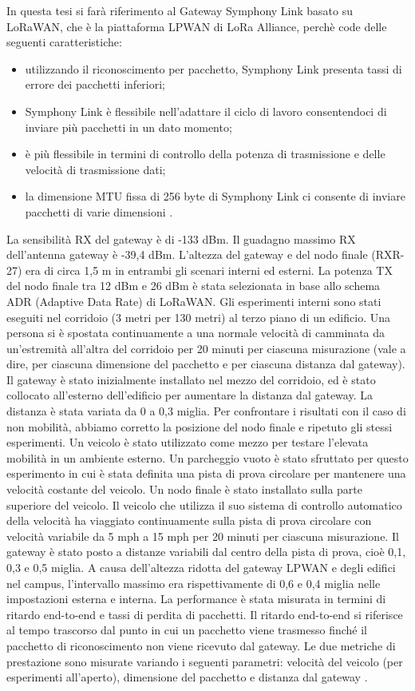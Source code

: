 \documentclass[a4paper]{report} %
\begin{document}
In questa tesi si farà riferimento al Gateway Symphony Link basato su LoRaWAN, che è la piattaforma LPWAN di LoRa Alliance, perchè code delle seguenti caratteristiche:
\begin{itemize}
\item utilizzando il riconoscimento per pacchetto, Symphony Link presenta tassi di errore dei pacchetti inferiori;
\item Symphony Link è flessibile nell'adattare il ciclo di lavoro consentendoci di inviare più pacchetti in un dato momento;
\item è più flessibile in termini di controllo della potenza di trasmissione e delle velocità di trasmissione dati;
\item la dimensione MTU fissa di 256 byte di Symphony Link ci consente di inviare pacchetti di varie dimensioni \cite{art:rif.47}.
\end{itemize}
La sensibilità RX del gateway è di -133 dBm. Il guadagno massimo RX dell'antenna gateway è -39,4 dBm. L'altezza del gateway e del nodo finale (RXR-27) era di circa 1,5 m in entrambi gli scenari interni ed esterni. La potenza TX del nodo finale tra 12 dBm e 26 dBm è stata selezionata in base allo schema ADR (Adaptive Data Rate) di LoRaWAN. Gli esperimenti interni sono stati eseguiti nel corridoio (3 metri per 130 metri) al terzo piano di un edificio. Una persona si è spostata continuamente a una normale velocità di camminata da un'estremità all'altra del corridoio per 20 minuti per ciascuna misurazione (vale a dire, per ciascuna dimensione del pacchetto e per ciascuna distanza dal gateway). Il gateway è stato inizialmente installato nel mezzo del corridoio, ed è stato collocato all'esterno dell'edificio per aumentare la distanza dal gateway. La distanza è stata variata da 0 a 0,3 miglia. Per confrontare i risultati con il caso di non mobilità, abbiamo corretto la posizione del nodo finale e ripetuto gli stessi esperimenti. Un veicolo è stato utilizzato come mezzo per testare l'elevata mobilità in un ambiente esterno. Un parcheggio vuoto è stato sfruttato per questo esperimento in cui è stata definita una pista di prova circolare per mantenere una velocità costante del veicolo. Un nodo finale è stato installato sulla parte superiore del veicolo. Il veicolo che utilizza il suo sistema di controllo automatico della velocità ha viaggiato continuamente sulla pista di prova circolare con velocità variabile da 5 mph a 15 mph per 20 minuti per ciascuna misurazione. Il gateway è stato posto a distanze variabili dal centro della pista di prova, cioè 0,1, 0,3 e 0,5 miglia. A causa dell'altezza ridotta del gateway LPWAN e degli edifici nel campus, l'intervallo massimo era rispettivamente di 0,6 e 0,4 miglia nelle impostazioni esterna e interna. La performance è stata misurata in termini di ritardo end-to-end e tassi di perdita di pacchetti. Il ritardo end-to-end si riferisce al tempo trascorso dal punto in cui un pacchetto viene trasmesso finché il pacchetto di riconoscimento non viene ricevuto dal gateway. Le due metriche di prestazione sono misurate variando i seguenti parametri: velocità del veicolo (per esperimenti all'aperto), dimensione del pacchetto e distanza dal gateway \cite{art:rif.47}. 
\end{document}

